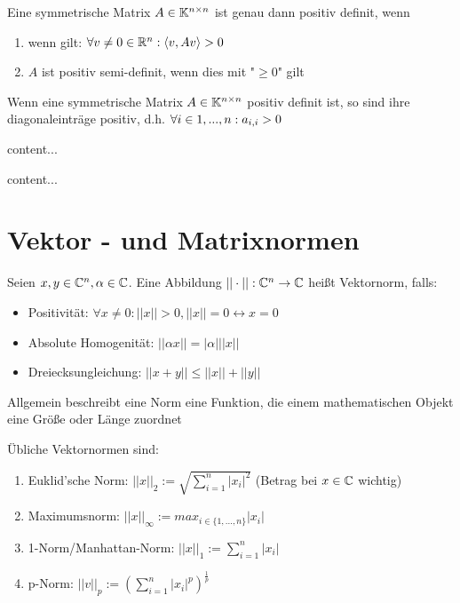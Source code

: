 \begin{satz}
	Eine symmetrische Matrix $A \in \mathbb{K}^{n \times n}$ ist genau dann positiv definit, wenn
	\begin{enumerate}[noitemsep]
		\item wenn gilt: $\forall v \neq 0 \in \mathbb{R}^n : \langle v, Av \rangle > 0$
		\item $A$ ist positiv semi-definit, wenn dies mit "$\geq 0$" gilt
	\end{enumerate}
\end{satz}

\begin{satz}
	Wenn eine symmetrische Matrix $A \in \mathbb{K}^{n \times n}$  positiv definit ist, so sind ihre diagonaleinträge positiv, d.h. $\forall i \in 1,...,n : a_{i,i} > 0$	
\end{satz}

\begin{definition}[Minor]
	content...
\end{definition}

\begin{satz}
	content...
\end{satz}

\pagebreak

\section{Vektor - und Matrixnormen}

\begin{definition}[Vektornorm]
	Seien $x, y \in \mathbb{C}^n, \alpha \in \mathbb{C}$. Eine Abbildung $||\cdot|| : \mathbb{C}^n \rightarrow \mathbb{C}$ heißt Vektornorm, falls:
	
	\begin{itemize}[noitemsep]
		\item Positivität: $\forall x \neq 0 : ||x|| > 0, ||x|| = 0 \leftrightarrow x = 0 $
		\item Absolute Homogenität: $||\alpha x|| = |\alpha| ||x||$
		\item Dreiecksungleichung: $||x + y|| \leq ||x|| + ||y||$
	\end{itemize}

	Allgemein beschreibt eine Norm eine Funktion, die einem mathematischen Objekt eine Größe oder Länge zuordnet
\end{definition}

\begin{definition}
	Übliche Vektornormen sind:
	\begin{enumerate}[noitemsep]
		\item Euklid'sche Norm: $||x||_2 := \sqrt{\sum_{i=1}^{n}|x_i|^2}$ (Betrag bei $x \in \mathbb{C}$ wichtig)
		\item Maximumsnorm: $||x||_\infty := max_{i \in \{1,...,n\}} |x_i|$
		\item 1-Norm/Manhattan-Norm: $||x||_1 := \sum_{i=1}^{n} |x_i|$
		\item p-Norm: $||v||_p := (\sum_{i=1}^{n} |x_i|^p)^{\frac{1}{p}}$
	\end{enumerate}
\end{definition}

